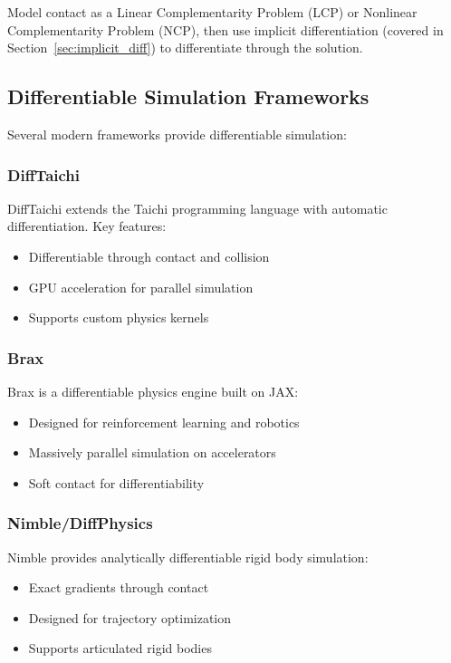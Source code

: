 Model contact as a Linear Complementarity Problem (LCP) or Nonlinear Complementarity Problem (NCP), then use implicit differentiation (covered in Section~\ref{sec:implicit_diff}) to differentiate through the solution.

\subsection{Differentiable Simulation Frameworks}

Several modern frameworks provide differentiable simulation:

\subsubsection{DiffTaichi}

DiffTaichi extends the Taichi programming language with automatic differentiation. Key features:
\begin{itemize}
    \item Differentiable through contact and collision
    \item GPU acceleration for parallel simulation
    \item Supports custom physics kernels
\end{itemize}

\subsubsection{Brax}

Brax is a differentiable physics engine built on JAX:
\begin{itemize}
    \item Designed for reinforcement learning and robotics
    \item Massively parallel simulation on accelerators
    \item Soft contact for differentiability
\end{itemize}

\subsubsection{Nimble/DiffPhysics}

Nimble provides analytically differentiable rigid body simulation:
\begin{itemize}
    \item Exact gradients through contact
    \item Designed for trajectory optimization
    \item Supports articulated rigid bodies
\end{itemize}

